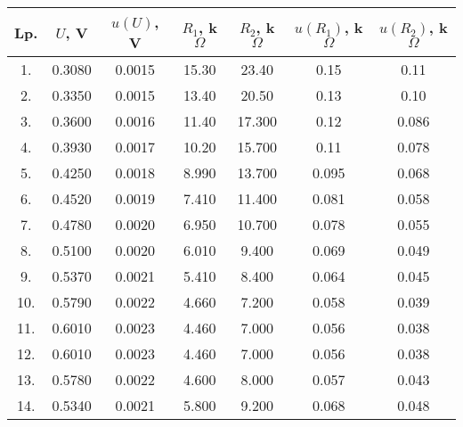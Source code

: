 \documentclass[12pt]{article}
\begin{document}
\begin{center}
    \begin{tabular} { | c | c | c | c | c | c | c | }
        \hline
        Lp. & $U$, V & $u(U)$, V & $R_1$, k$\Omega$ & $R_2$, k$\Omega$ & $u(R_1)$, k$\Omega$ & $u(R_2)$, k$\Omega$ \\
        \hline
        1.  & 0.3080 & 0.0015    & 15.30            & 23.40            & 0.15                & 0.11                \\ \hline
        2.  & 0.3350 & 0.0015    & 13.40            & 20.50            & 0.13                & 0.10                \\ \hline
        3.  & 0.3600 & 0.0016    & 11.40            & 17.300           & 0.12                & 0.086               \\ \hline
        4.  & 0.3930 & 0.0017    & 10.20            & 15.700           & 0.11                & 0.078               \\ \hline
        5.  & 0.4250 & 0.0018    & 8.990            & 13.700           & 0.095               & 0.068               \\ \hline
        6.  & 0.4520 & 0.0019    & 7.410            & 11.400           & 0.081               & 0.058               \\ \hline
        7.  & 0.4780 & 0.0020    & 6.950            & 10.700           & 0.078               & 0.055               \\ \hline
        8.  & 0.5100 & 0.0020    & 6.010            & 9.400            & 0.069               & 0.049               \\ \hline
        9.  & 0.5370 & 0.0021    & 5.410            & 8.400            & 0.064               & 0.045               \\ \hline
        10. & 0.5790 & 0.0022    & 4.660            & 7.200            & 0.058               & 0.039               \\ \hline
        11. & 0.6010 & 0.0023    & 4.460            & 7.000            & 0.056               & 0.038               \\ \hline
        12. & 0.6010 & 0.0023    & 4.460            & 7.000            & 0.056               & 0.038               \\ \hline
        13. & 0.5780 & 0.0022    & 4.600            & 8.000            & 0.057               & 0.043               \\ \hline
        14. & 0.5340 & 0.0021    & 5.800            & 9.200            & 0.068               & 0.048               \\ \hline

\end{tabular}
\end{center}
\end{document}

